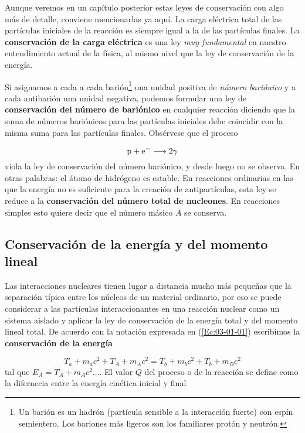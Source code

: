 Aunque veremos en un capítulo posterior estas leyes de conservación con algo más de detalle, conviene mencionarlas ya aquí. La carga eléctrica total de las partículas iniciales de la reacción es siempre igual a la de las partículas finales. La \textbf{conservación de la carga eléctrica} es una ley \textit{muy fundamental} en nuestro entendimiento actual de la física, al mismo nivel que la ley de conservación de la energía.


Si asignamos a cada a cada barión\footnote{Un barión es un hadrón (partícula sensible a la interacción fuerte) con espín semientero. Los bariones más ligeros son los familiares protón y neutrón.} una unidad positiva de \textit{número bariónico} y a cada antibarión una unidad negativa, podemos formular una ley de \textbf{conservación del número de bariónico} en cualquier reacción diciendo que la suma de números bariónicos para las partículas iniciales debe coincidir con la misma suma para las partículas finales. Obsérvese que el proceso 
 
\begin{equation}
    \text{p} + \text{e}^- \longrightarrow  2 \gamma
\end{equation}
viola la ley de conservación del número bariónico, y desde luego no se observa. En otras palabras: el átomo de hidrógeno es estable. En reacciones ordinarias en las que la energía no es suficiente para la creación de antipartículas, esta ley se reduce a la \textbf{conservación del número total de nucleones}. En reacciones simples esto quiere decir que el número másico $A$ se conserva.

\subsection{Conservación de la energía y del momento lineal}

Las interacciones nucleares tienen lugar a distancia mucho más pequeñas que la separación típica entre los núcleos de un material ordinario, por eso se puede considerar a las partículas interaccionantes en una reacción nuclear como un sistema aislado y aplicar la ley de conservación de la energía total y del momento lineal total. De acuerdo con la notación expresada en (\ref{Ec:03-01-01}) escribimos la \textbf{conservación de la energía}

\begin{equation}
    T_a + m_a c^2 +T_A+m_A c^2 = T_b +m_bc^2 + T_b + m_Bc^2
\end{equation}
tal que $E_A = T_A + m_Ac^2\ldots$. El valor $Q$ del proceso o de la reacción se define como la difernecia entre la energía cinética inicial y final 

